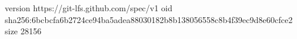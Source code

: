 version https://git-lfs.github.com/spec/v1
oid sha256:6bcbcfa6b2724ce94ba5adea88030182b8b138056558c8b4f39ec9d8e60cfce2
size 28156
